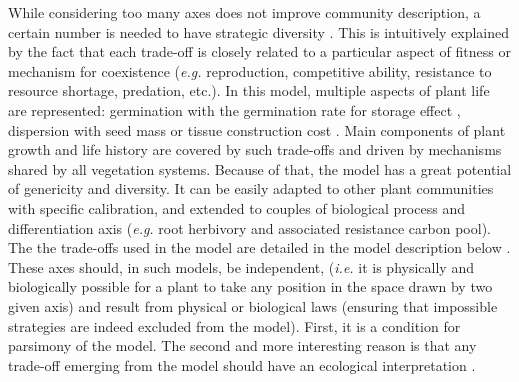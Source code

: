 While considering too many axes does not improve community description, a certain number is needed to have strategic diversity \cite{laughlin_intrinsic_2014}. This is intuitively explained by the fact that each trade-off is closely related to a particular aspect of fitness or mechanism for coexistence (\textit{e.g.} reproduction, competitive ability, resistance to resource shortage, predation, etc.). In this model, multiple aspects of plant life are represented: germination with the germination rate for storage effect \cite{chesson_general_2000, adler_climate_2006}, dispersion with seed mass \cite{westoby_leaf-height-seed_1998} or tissue construction cost \cite{reich_leaf_1992, wright_worldwide_2004, reich_world-wide_2014}. Main components of plant growth and life history are covered by such trade-offs and driven by mechanisms shared by all vegetation systems. Because of that, the model has a great potential of genericity and diversity. It can be easily adapted to other plant communities with specific calibration, and extended to couples of biological process and differentiation axis (\textit{e.g.} root herbivory and associated resistance carbon pool). The the trade-offs used in the model are detailed in the model description below . These axes should, in such models, be independent, (\textit{i.e.} it is physically and biologically possible for a plant to take any position in the space drawn by two given axis) and result from physical or biological laws (ensuring that impossible strategies are indeed excluded from the model). First, it is a condition for parsimony of the model. The second and more interesting reason is that any trade-off emerging from the model should have an ecological interpretation \cite{maire_disentangling_2013}. \\
 

